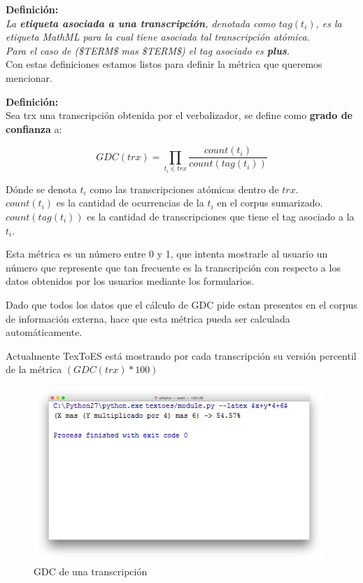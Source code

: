\textbf{Definición:}\\\textit{La \textbf{etiqueta asociada a una transcripción}, denotada como $tag(t_i)$, es la etiqueta MathML para la cual tiene asociada tal transcripción atómica.\\Para el caso de (\$TERM\$ mas \$TERM\$) el tag asociado es \textbf{plus}.}\\

Con estas definiciones estamos listos para definir la métrica que queremos mencionar.

\textbf{Definición:}\\Sea trx una transcripción obtenida por el verbalizador, se define como \textbf{grado de confianza} a:

$$GDC(trx) = \prod_{t_i \in trx} \frac{count(t_i)}{count(tag(t_i))}$$

Dónde se denota $t_i$ como las transcripciones atómicas dentro de $trx$.\\
$count(t_i)$ es la cantidad de ocurrencias de la $t_i$ en el corpus sumarizado.\\
$count(tag(t_i))$ es la cantidad de transcripciones que tiene el tag asociado a la $t_i$.

Esta métrica es un número entre 0 y 1, que intenta mostrarle al usuario un número que represente que tan frecuente es la transcripción con respecto a los datos obtenidos por los usuarios mediante los formularios.

Dado que todos los datos que el cálculo de GDC pide estan presentes en el corpus de información externa, hace que esta métrica pueda ser calculada automáticamente.

Actualmente TexToES está mostrando por cada transcripción su versión percentil de la métrica $(GDC(trx) * 100)$

\begin{figure}[H]
\centering
	\includegraphics[width=11cm, height=6.62cm]{Figures/demo_1}
	\caption[]{GDC de una transcripción}
\label{fig:demo_1}
\end{figure}

